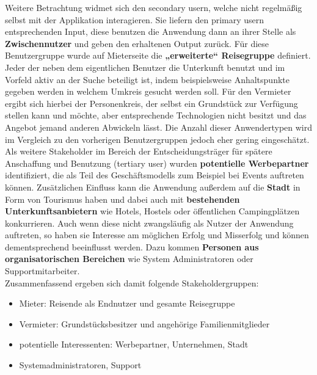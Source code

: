 Weitere Betrachtung widmet sich den secondary usern, welche nicht regelmäßig selbst mit der Applikation interagieren. Sie liefern den primary usern entsprechenden Input, diese benutzen die Anwendung dann an ihrer Stelle als \textbf{Zwischennutzer} und geben den erhaltenen Output zurück. Für diese Benutzergruppe wurde auf Mieterseite die \textbf{„erweiterte“ Reisegruppe} definiert. Jeder der neben dem eigentlichen Benutzer die Unterkunft benutzt und im Vorfeld aktiv an der Suche beteiligt ist, indem beispielsweise Anhaltspunkte gegeben werden in welchem Umkreis gesucht werden soll.
Für den Vermieter ergibt sich hierbei der Personenkreis, der selbst ein Grundstück zur Verfügung stellen kann und möchte, aber entsprechende Technologien nicht besitzt und das Angebot jemand anderen Abwickeln lässt. Die Anzahl dieser Anwendertypen wird im Vergleich zu den vorherigen Benutzergruppen jedoch eher gering eingeschätzt.\\
 
Als weitere Stakeholder im Bereich der Entscheidungsträger für spätere Anschaffung und Benutzung (tertiary user) wurden \textbf{potentielle Werbepartner} identifiziert, die als Teil des Geschäftsmodells zum Beispiel bei Events auftreten können. Zusätzlichen Einfluss kann die Anwendung außerdem auf die \textbf{Stadt} in Form von Tourismus haben und dabei auch mit \textbf{bestehenden Unterkunftsanbietern} wie Hotels, Hostels oder öffentlichen Campingplätzen konkurrieren. Auch wenn diese nicht zwangsläufig als Nutzer der Anwendung auftreten, so haben sie Interesse am möglichen Erfolg und Misserfolg und können dementsprechend beeinflusst werden.
Dazu kommen \textbf{Personen aus organisatorischen Bereichen} wie System Administratoren oder Supportmitarbeiter.\\
 
 Zusammenfassend ergeben sich damit folgende Stakeholdergruppen:

 \begin{itemize}
   \item
   Mieter: Reisende als Endnutzer und gesamte Reisegruppe

   \item 
   Vermieter: Grundstücksbesitzer und angehörige Familienmitglieder

   \item
   potentielle Interessenten: Werbepartner, Unternehmen, Stadt

   \item
   Systemadministratoren, Support\\
\end{itemize} 

